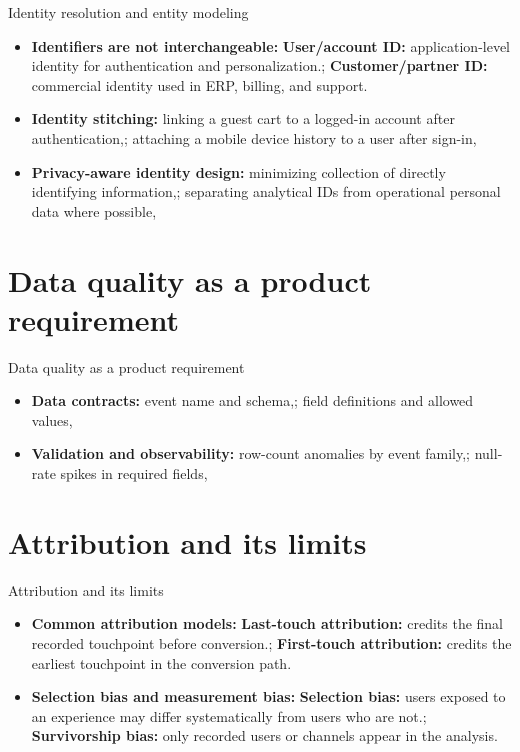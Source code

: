 \documentclass[aspectratio=169]{beamer}
\begin{document}
\begin{frame}{Identity resolution and entity modeling}
  \begin{itemize}
    \item \textbf{Identifiers are not interchangeable:} \textbf{User/account ID:} application-level identity for authentication and personalization.; \textbf{Customer/partner ID:} commercial identity used in ERP, billing, and support.
    \item \textbf{Identity stitching:} linking a guest cart to a logged-in account after authentication,; attaching a mobile device history to a user after sign-in,
    \item \textbf{Privacy-aware identity design:} minimizing collection of directly identifying information,; separating analytical IDs from operational personal data where possible,
  \end{itemize}
\end{frame}

\section{Data quality as a product requirement}

\begin{frame}{Data quality as a product requirement}
  \begin{itemize}
    \item \textbf{Data contracts:} event name and schema,; field definitions and allowed values,
    \item \textbf{Validation and observability:} row-count anomalies by event family,; null-rate spikes in required fields,
  \end{itemize}
\end{frame}

\section{Attribution and its limits}

\begin{frame}{Attribution and its limits}
  \begin{itemize}
    \item \textbf{Common attribution models:} \textbf{Last-touch attribution:} credits the final recorded touchpoint before conversion.; \textbf{First-touch attribution:} credits the earliest touchpoint in the conversion path.
    \item \textbf{Selection bias and measurement bias:} \textbf{Selection bias:} users exposed to an experience may differ systematically from users who are not.; \textbf{Survivorship bias:} only recorded users or channels appear in the analysis.
  \end{itemize}
\end{frame}
\end{document}
